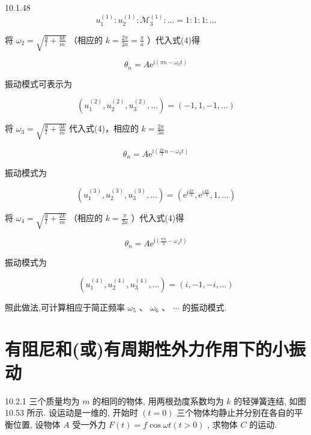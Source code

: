 \begin{problem}{10.1.48}
\[
u _ {1} ^ {(1)}: u _ {2} ^ {(1)}: \mathcal {M} _ {3} ^ {(1)}: \dots = 1: 1: 1: \dots
\]

将 $\omega_{2} = \sqrt{\frac{g}{l} + \frac{4k}{m}}$ （相应的 $k = \frac{2\pi}{2a} = \frac{\pi}{a}$ ）代入式(4)得

\[
\theta_ {n} = A \mathrm{e} ^ {\mathrm{i} (\pi n - \omega_ {2} t)}
\]

振动模式可表示为

\[
(u _ {1} ^ {(2)}, u _ {2} ^ {(2)}, u _ {3} ^ {(2)}, \dots) = (- 1, 1, - 1, \dots)
\]

将 $\omega_{3} = \sqrt{\frac{g}{l} + \frac{3k}{m}}$ 代入式(4)，相应的 $k = \frac{2\pi}{3a}$ 

\[
\theta_ {n} = A \mathrm{e} ^ {\mathrm{i} \left(\frac {2 \pi}{3} n - \omega_ {3} t\right)}
\]

振动模式为

\[
\left(u _ {1} ^ {(3)}, u _ {2} ^ {(3)}, u _ {3} ^ {(3)}, \dots\right) = \left(\mathrm{e} ^ {\mathrm{i} \frac {2 \pi}{3}}, \mathrm{e} ^ {\mathrm{i} \frac {4 \pi}{3}}, 1, \dots\right)
\]

将 $\omega_{4} = \sqrt{\frac{g}{l} + \frac{2k}{m}}$ （相应的 $k = \frac{\pi}{2a}$ ）代入式(4)得

\[
\theta_ {n} = A \mathrm{e} ^ {\mathrm{i} \left(\frac {\pi n}{2} - \omega_ {4} t\right)}
\]

振动模式为

\[
(u _ {1} ^ {(4)}, u _ {2} ^ {(4)}, u _ {3} ^ {(4)}, \dots) = (i, - 1, - i, \dots)
\]

照此做法,可计算相应于简正频率 $\omega_{5}$ 、 $\omega_{6}$ 、 $\cdots$ 的振动模式.
\begin{center}

\end{center}
\begin{center}

\end{center}
\end{problem}
\clearpage


\section{有阻尼和(或)有周期性外力作用下的小振动}

\begin{problem}{10.2.1}
三个质量均为 $m$ 的相同的物体, 用两根劲度系数均为 $k$ 的轻弹簧连结, 如图 10.53 所示. 设运动是一维的, 开始时 $(t = 0)$ 三个物体均静止并分别在各自的平衡位置, 设物体 $A$ 受一外力 $F(t) = f\cos \omega t (t > 0)$ , 求物体 $C$ 的运动.
\begin{center}

\end{center}
\end{problem}
\clearpage


